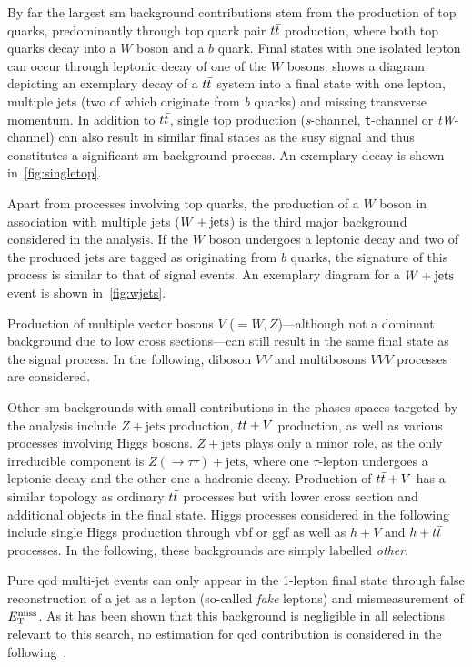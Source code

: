 By far the largest \gls{sm} background contributions stem from the production of top quarks, predominantly through top quark pair $t\bar{t}$ production, where both top quarks decay into a $W$ boson and a $b$ quark. Final states with one isolated lepton can occur through leptonic decay of one of the $W$ bosons.  shows a diagram depicting an exemplary decay of a $t\bar{t}$ system into a final state with one lepton, multiple jets (two of which originate from \textit{b} quarks) and missing transverse momentum. In addition to $t\bar{t}$, single top production (\textit{s}-channel, \texttt{t}-channel or \textit{tW}-channel) can also result in similar final states as the \gls{susy} signal and thus constitutes a significant \gls{sm} background process. An exemplary decay is shown in~\cref{fig:singletop}.

Apart from processes involving top quarks, the production of a $W$ boson in association with multiple jets ($W+\mathrm{jets}$) is the third major background considered in the analysis. If the $W$ boson undergoes a leptonic decay and two of the produced jets are tagged as originating from $b$ quarks, the signature of this process is similar to that of signal events. An exemplary diagram for a $W+\mathrm{jets}$ event is shown in~\cref{fig:wjets}. 

Production of multiple vector bosons $V$ ($=W,Z$)---although not a dominant background due to low cross sections---can still result in the same final state as the signal process. In the following, diboson $VV$ and multibosons $VVV$ processes are considered.

Other \gls{sm} backgrounds with small contributions in the phases spaces targeted by the analysis include $Z+\mathrm{jets}$ production, $t\bar{t}+V$ production, as well as various processes involving Higgs bosons. $Z+\mathrm{jets}$ plays only a minor role, as the only irreducible component is $Z(\rightarrow\tau\tau)+\mathrm{jets}$, where one $\tau$-lepton undergoes a leptonic decay and the other one a hadronic decay. Production of $t\bar{t}+V$ has a similar topology as ordinary $t\bar{t}$ processes but with lower cross section and additional objects in the final state. Higgs processes considered in the following include single Higgs production through \gls{vbf} or \gls{ggf} as well as $h+V$ and $h+t\bar{t}$ processes. In the following, these backgrounds are simply labelled \textit{other}. 

Pure \gls{qcd} multi-jet events can only appear in the 1-lepton final state through false reconstruction of a jet as a lepton (so-called \textit{fake} leptons) and mismeasurement of $E_{\textrm{T}}^{\textrm{miss}}$. As it has been shown that this background is negligible in all selections relevant to this search, no estimation for \gls{qcd} contribution is considered in the following~\cite{SUSY-2019-08}.

